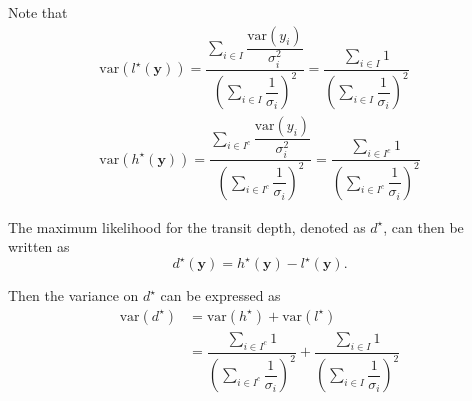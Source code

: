 \documentclass{article}
\begin{document}
Note that
\begin{align}
    \mathrm{var}\left(l^{\star}(\bm{y})\right) = \dfrac{\displaystyle\sum_{i \in I}\dfrac{\mathrm{var}(y_i)}{\sigma^2_i}}
    {\displaystyle\left(\sum_{i\in I}\dfrac{1}{\sigma_i}\right)^{2}}
    = \dfrac{\displaystyle\sum_{i \in I} 1}
    {\displaystyle\left(\sum_{i\in I}\dfrac{1}{\sigma_i}\right)^{2}}\\
    \mathrm{var}\left(h^{\star}(\bm{y})\right) = \dfrac{\displaystyle\sum_{i \in I^c}\dfrac{\mathrm{var}(y_i)}{\sigma^2_i}}
    {\displaystyle\left(\sum_{i\in I^c}\dfrac{1}{\sigma_i}\right)^{2}}
    = \dfrac{\displaystyle\sum_{i \in I^c} 1}
    {\displaystyle\left(\sum_{i\in I^c}\dfrac{1}{\sigma_i}\right)^{2}}
\end{align}

The maximum likelihood for the transit depth, denoted as $d^{\star}$, can then be written as
\begin{equation}
    d^{\star}(\bm{y}) = h^{\star}(\bm{y}) - l^{\star}(\bm{y}).
\end{equation}

Then the variance on $d^{\star}$ can be expressed as
\begin{align}
    \mathrm{var}\left(d^{\star}\right) &= \mathrm{var}\left(h^{\star}\right) + \mathrm{var}\left(l^{\star}\right)\\
    &= \dfrac{\displaystyle\sum_{i \in I^c} 1}
    {\displaystyle\left(\sum_{i\in I^c}\dfrac{1}{\sigma_i}\right)^{2}} +
    \dfrac{\displaystyle\sum_{i \in I} 1}
    {\displaystyle\left(\sum_{i\in I}\dfrac{1}{\sigma_i}\right)^{2}}
\end{align}
\end{document}

